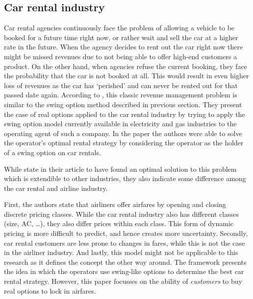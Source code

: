 \subsection{Car rental industry}
Car rental agencies continuously face the problem of allowing a vehicle to be booked for a future time right now, or rather wait and sell the car at a higher rate in the future. When the agency decides to rent out the car right now there might be missed revenues due to not being able to offer high-end customers a product. On the other hand, when agencies refuse the current booking, they face the probability that the car is not booked at all. This would result in even higher loss of revenues as the car has `perished' and can never be rented out for that passed date again. According to , this classic revenue management problem is similar to the swing option method described in previous section. They present the case of real options applied to the car rental industry by trying to apply the swing option model currently available in electricity and gas industries to the operating agent of such a company. In the paper the authors were able to solve the operator's optimal rental strategy by considering the operator as the holder of a swing option on car rentals.

While  state in their article to have found an optimal solution to this problem which is extendible to other industries, they also indicate some difference among the car rental and airline industry.

First, the authors state that airliners offer airfares by opening and closing discrete pricing classes. While the car rental industry also has different classes (size, AC, \ldots), they also differ prices within each class. This form of dynamic pricing is more difficult to predict, and hence creates more uncertainty. Secondly, car rental customers are less prone to changes in fares, while this is not the case in the airliner industry. And lastly, this model might not be applicable to this research as it defines the concept the other way around. The framework presents the idea in which the operators use swing-like options to determine the best car rental strategy. However, this paper focusses on the ability of \emph{customers} to buy real options to lock in airfares.

